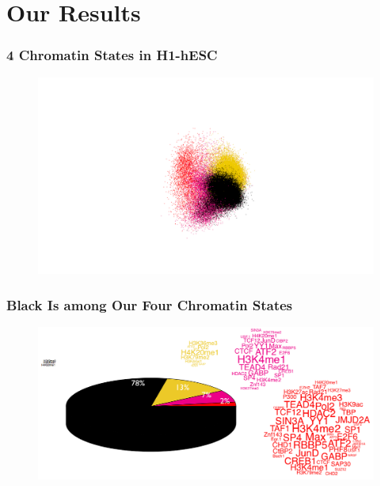 \documentclass{beamer}
\begin{document}
\begin{frame}
\begin{columns}
	\end{columns}
\end{frame}

\section{Our Results}
\begin{frame}
	\frametitle{4 Chromatin States in H1-hESC 
	   \href{http://lab.thegrandlocus.com/static/images/human_4color.gif}{}}

			\begin{figure}
				\includegraphics[width=1.0\textwidth]{figs/PCA4Color}
			\end{figure}
			

\end{frame}

\begin{frame}
	\frametitle{Black Is among Our Four Chromatin States}
	\begin{figure}
   			\includegraphics[width=1\textwidth]{figs/3Dpizza}
    \end{figure}

\end{frame}
\end{document}
